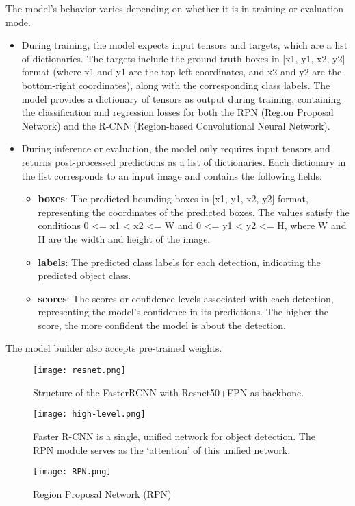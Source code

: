 The model's behavior varies depending on whether it is in training or evaluation mode.
\begin{itemize}
    \item During training, the model expects input tensors and targets, which are a list of dictionaries. The targets include the ground-truth boxes in [x1, y1, x2, y2] format (where x1 and y1 are the top-left coordinates, and x2 and y2 are the bottom-right coordinates), along with the corresponding class labels. The model provides a dictionary of tensors as output during training, containing the classification and regression losses for both the RPN (Region Proposal Network) and the R-CNN (Region-based Convolutional Neural Network).
    \item During inference or evaluation, the model only requires input tensors and returns post-processed predictions as a list of dictionaries. Each dictionary in the list corresponds to an input image and contains the following fields:
    \begin{itemize}
        \item \textbf{boxes}: The predicted bounding boxes in [x1, y1, x2, y2] format, representing the coordinates of the predicted boxes. The values satisfy the conditions 0 <= x1 < x2 <= W and 0 <= y1 < y2 <= H, where W and H are the width and height of the image.
        \item \textbf{labels}: The predicted class labels for each detection, indicating the predicted object class.
        \item \textbf{scores}: The scores or confidence levels associated with each detection, representing the model's confidence in its predictions. The higher the score, the more confident the model is about the detection.

    \end{itemize}
\end{itemize}

The model builder also accepts pre-trained weights.

\begin{figure}[h!]
  \centering
  \texttt{[image: resnet.png]}
  \caption{Structure of the FasterRCNN with Resnet50+FPN as backbone.}
  \label{fig:resnetstruct}
\end{figure}
\begin{figure}[h!]
  \centering
  \texttt{[image: high-level.png]}
  \caption{Faster R-CNN is a single, unified network for object detection. The RPN module serves as the ‘attention’ of this unified network.}
  \label{fig:generalrcnn}
\end{figure}
\begin{figure}[h!]
  \centering
  \texttt{[image: RPN.png]}
  \caption{Region Proposal Network (RPN)}
  \label{fig:rpn}
\end{figure}

